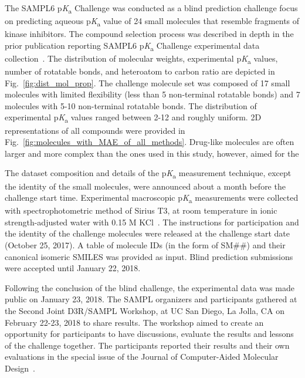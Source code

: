 \documentclass[9pt,lineno,final]{elife}
\newcommand{\pKa}{p\textit{K}\textsubscript{a}}
\begin{document}
The SAMPL6 \pKa{} Challenge was conducted as a blind prediction challenge focus on predicting aqueous \pKa{} value of 24 small molecules that resemble fragments of kinase inhibitors. 
The compound selection process was described in depth in the prior publication reporting SAMPL6 \pKa{} Challenge experimental data collection~\citep{Isik:2018:J.Comput.AidedMol.Des.}.
The distribution of molecular weights, experimental \pKa{} values, number of rotatable bonds, and heteroatom to carbon ratio are depicted in Fig.~\ref{fig:dist_mol_prop}. The challenge molecule set was composed of 17 small molecules with limited flexibility (less than 5 non-terminal rotatable bonds) and 7 molecules with 5-10 non-terminal rotatable bonds. 
The distribution of experimental \pKa{} values ranged between 2-12 and roughly uniform. 
2D representations of all compounds were provided in Fig.~\ref{fig:molecules_with_MAE_of_all_methods}. 
Drug-like molecules are often larger and more complex than the ones used in this study, however, aimed for the

The dataset composition and details of the \pKa{} measurement technique, except the identity of the small molecules, were announced about a month before the challenge start time. 
Experimental macroscopic \pKa{} measurements were collected with spectrophotometric method of Sirius T3, at room temperature in ionic strength-adjusted water with 0.15 M KCl~\citep{Isik:2018:J.Comput.AidedMol.Des.}. 
The instructions for participation and the identity of the challenge molecules were released at the challenge start date (October 25, 2017). 
A table of molecule IDs (in the form of SM\#\#) and	their canonical isomeric SMILES was provided as input.
Blind prediction submissions were accepted until January 22, 2018. 

Following the conclusion of the blind challenge, the experimental data was made public on January 23, 2018. The SAMPL organizers and participants gathered at the Second Joint D3R/SAMPL Workshop, at UC San Diego, La Jolla, CA on February 22-23, 2018 to share results.
The workshop aimed to create an opportunity for participants to have discussions, evaluate the results and lessons of the challenge together. 
The participants reported their results and their own evaluations in the special issue of the Journal of Computer-Aided Molecular Design~\citep{JCAMD_special_issue_pKa}. 
\end{document}
